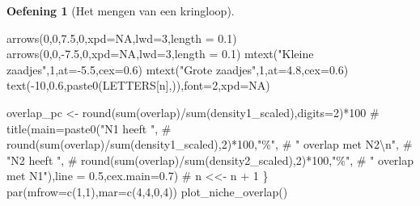 \documentclass[
  a4paper,
]{scrbook}
\newenvironment{Shaded}{\begin{snugshade}}{\end{snugshade}}
\newcommand{\AttributeTok}[1]{\textcolor[rgb]{0.40,0.45,0.13}{#1}}
\newcommand{\CommentTok}[1]{\textcolor[rgb]{0.37,0.37,0.37}{#1}}
\newcommand{\ConstantTok}[1]{\textcolor[rgb]{0.56,0.35,0.01}{#1}}
\newcommand{\DecValTok}[1]{\textcolor[rgb]{0.68,0.00,0.00}{#1}}
\newcommand{\FloatTok}[1]{\textcolor[rgb]{0.68,0.00,0.00}{#1}}
\newcommand{\FunctionTok}[1]{\textcolor[rgb]{0.28,0.35,0.67}{#1}}
\newcommand{\NormalTok}[1]{\textcolor[rgb]{0.00,0.23,0.31}{#1}}
\newcommand{\OtherTok}[1]{\textcolor[rgb]{0.00,0.23,0.31}{#1}}
\newcommand{\SpecialCharTok}[1]{\textcolor[rgb]{0.37,0.37,0.37}{#1}}
\newcommand{\StringTok}[1]{\textcolor[rgb]{0.13,0.47,0.30}{#1}}
\theoremstyle{definition}
\newtheorem{exercise}{Oefening}[chapter]
\theoremstyle{remark}
\begin{document}
\begin{exercise}[Het mengen van een
kringloop]
\begin{Shaded}
\begin{Highlighting}[]
  \FunctionTok{arrows}\NormalTok{(}\DecValTok{0}\NormalTok{,}\DecValTok{0}\NormalTok{,}\FloatTok{7.5}\NormalTok{,}\DecValTok{0}\NormalTok{,}\AttributeTok{xpd=}\ConstantTok{NA}\NormalTok{,}\AttributeTok{lwd=}\DecValTok{3}\NormalTok{,}\AttributeTok{length =} \FloatTok{0.1}\NormalTok{)}
  \FunctionTok{arrows}\NormalTok{(}\DecValTok{0}\NormalTok{,}\DecValTok{0}\NormalTok{,}\SpecialCharTok{{-}}\FloatTok{7.5}\NormalTok{,}\DecValTok{0}\NormalTok{,}\AttributeTok{xpd=}\ConstantTok{NA}\NormalTok{,}\AttributeTok{lwd=}\DecValTok{3}\NormalTok{,}\AttributeTok{length =} \FloatTok{0.1}\NormalTok{)}
  \FunctionTok{mtext}\NormalTok{(}\StringTok{"Kleine zaadjes"}\NormalTok{,}\DecValTok{1}\NormalTok{,}\AttributeTok{at=}\SpecialCharTok{{-}}\FloatTok{5.5}\NormalTok{,}\AttributeTok{cex=}\FloatTok{0.6}\NormalTok{)}
  \FunctionTok{mtext}\NormalTok{(}\StringTok{"Grote zaadjes"}\NormalTok{,}\DecValTok{1}\NormalTok{,}\AttributeTok{at=}\FloatTok{4.8}\NormalTok{,}\AttributeTok{cex=}\FloatTok{0.6}\NormalTok{)}
  \FunctionTok{text}\NormalTok{(}\SpecialCharTok{{-}}\DecValTok{10}\NormalTok{,}\FloatTok{0.6}\NormalTok{,}\FunctionTok{paste0}\NormalTok{(LETTERS[n],}\StringTok{\textquotesingle{})\textquotesingle{}}\NormalTok{),}\AttributeTok{font=}\DecValTok{2}\NormalTok{,}\AttributeTok{xpd=}\ConstantTok{NA}\NormalTok{)}
  
\NormalTok{  overlap\_pc }\OtherTok{\textless{}{-}} \FunctionTok{round}\NormalTok{(}\FunctionTok{sum}\NormalTok{(overlap)}\SpecialCharTok{/}\FunctionTok{sum}\NormalTok{(density1\_scaled),}\AttributeTok{digits=}\DecValTok{2}\NormalTok{)}\SpecialCharTok{*}\DecValTok{100}
\CommentTok{\#   title(main=paste0("N1 heeft ", }
\CommentTok{\#                     round(sum(overlap)/sum(density1\_scaled),2)*100,"\%",}
\CommentTok{\#                     " overlap met N2\textbackslash{}n",}
\CommentTok{\#                     "N2 heeft ", }
\CommentTok{\#                     round(sum(overlap)/sum(density2\_scaled),2)*100,"\%",}
\CommentTok{\#                     " overlap met N1"),line = 0.5,cex.main=0.7)}
\CommentTok{\#   n \textless{}\textless{}{-} n + 1}
\NormalTok{\}}
\FunctionTok{par}\NormalTok{(}\AttributeTok{mfrow=}\FunctionTok{c}\NormalTok{(}\DecValTok{1}\NormalTok{,}\DecValTok{1}\NormalTok{),}\AttributeTok{mar=}\FunctionTok{c}\NormalTok{(}\DecValTok{4}\NormalTok{,}\DecValTok{4}\NormalTok{,}\DecValTok{0}\NormalTok{,}\DecValTok{4}\NormalTok{))}
\FunctionTok{plot\_niche\_overlap}\NormalTok{()}
\end{Highlighting}
\end{Shaded}


\end{exercise}
\end{document}
